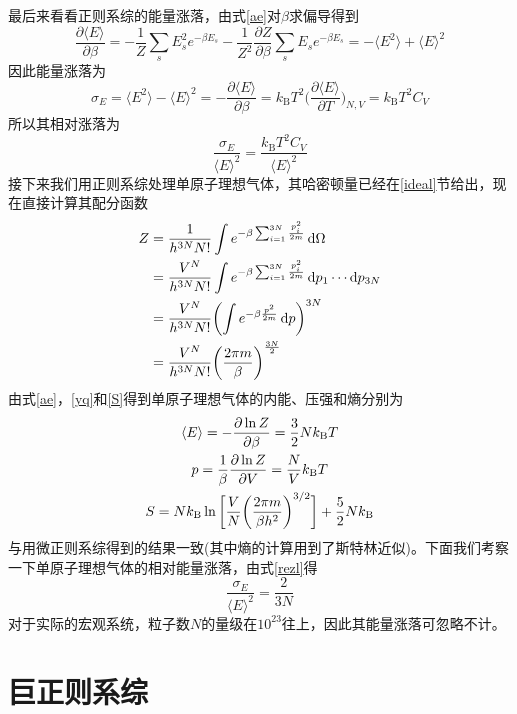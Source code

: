 \documentclass[UTF8,oneside,openany]{ctexbook}
\DeclareMathOperator\dif{d\!}
\newcommand\aver[1]{\langle#1\rangle}
\newcommand\kb{k_{\text{B}}}
\begin{document}
最后来看看正则系综的能量涨落，由式\ref{ae}对$\beta$求偏导得到
\begin{equation}
\frac{\partial\aver{E}}{\partial\beta}=-\frac1Z\sum_{s}E_s^2e^{-\beta E_s}-\frac{1}{Z^2}\frac{\partial Z}{\partial\beta}\sum_{s}E_se^{-\beta E_s}=-\aver{E^2}+\aver{E}^2
\end{equation}
因此能量涨落为
\begin{equation}\label{ezl}
\sigma_E=\aver{E^2}-\aver{E}^2=-\frac{\partial\aver{E}}{\partial\beta}=\kb T^2\biggl(\frac{\partial\aver{E}}{\partial T}\biggr)_{N,V}=\kb T^2C_V
\end{equation}
所以其相对涨落为
\begin{equation}\label{rezl}
\frac{\sigma_E}{\aver{E}^2}=\frac{\kb T^2C_V}{\aver{E}^2}
\end{equation}
接下来我们用正则系综处理单原子理想气体，其哈密顿量已经在\ref{ideal}节给出，现在直接计算其配分函数
\begin{align}
Z&=\frac{1}{h^{3N}N!}\int e^{-\beta\sum_{i=1}^{3N}\frac{p_i^2}{2m}}\dif\Omega\notag\\
&=\frac{V^N}{h^{3N}N!}\int e^{-\beta\sum_{i=1}^{3N}\frac{p_i^2}{2m}}\dif p_1\cdots\dif p_{3N}\notag\\
&=\frac{V^N}{h^{3N}N!}\biggl(\int e^{-\beta\frac{p^2}{2m}}\dif p\biggr)^{3N}\notag\\
&=\frac{V^N}{h^{3N}N!}\bigg(\frac{2\pi m}{\beta}\bigg)^{\frac{3N}{2}}
\end{align}
由式\ref{ae}，\ref{yq}和\ref{S}得到单原子理想气体的内能、压强和熵分别为
\begin{gather}
\aver{E}=-\frac{\partial\ln Z}{\partial\beta}=\frac32 N\kb T\notag\\
p=\frac{1}{\beta}\frac{\partial\ln Z}{\partial V}=\frac{N}{V}\kb T\notag\\
S=N\kb\ln\bigg[\frac{V}{N}\bigg(\frac{2\pi m}{\beta h^2}\bigg)^{3/2}\bigg]+\frac52 N\kb
\end{gather}
与用微正则系综得到的结果一致(其中熵的计算用到了斯特林近似)。下面我们考察一下单原子理想气体的相对能量涨落，由式\ref{rezl}得
\begin{equation}
\frac{\sigma_E}{\aver{E}^2}=\frac{2}{3N}
\end{equation}
对于实际的宏观系统，粒子数$N$的量级在$10^{23}$往上，因此其能量涨落可忽略不计。
\chapter{巨正则系综}
\end{document}
